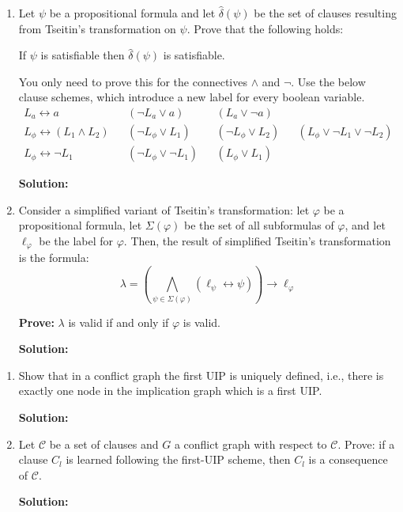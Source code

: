 \documentclass[11pt,a4paper]{uebung}
\newcommand{\solution}[1]{\par {\bf Solution:}\\#1}
\begin{document}
\begin{enumerate}

\item Let $\psi$ be a propositional formula and let $\hat{\delta}(\psi)$ be the set
  of clauses resulting from Tseitin's transformation on $\psi$. Prove that the
  following holds:
  
  \centerline{If $\psi$ is satisfiable then $\hat{\delta}(\psi)$ is satisfiable.}

  You only need to prove this for the connectives $\land$ and $\neg$.
  Use the below clause schemes, which introduce a new label for every boolean
  variable.
  \begin{align*}
    L_a \leftrightarrow a && (\neg L_a \lor a)&& (L_a \lor \neg a)\\
    L_\phi \leftrightarrow (L_1 \land L_2) && (\neg L_\phi \lor L_1)&& (\neg
    L_\phi \lor L_2)&& (L_\phi \lor \neg L_1 \lor \neg L_2)\\
    L_\phi \leftrightarrow \neg L_1 && (\neg L_\phi \lor \neg L_1)&& (L_\phi
    \lor L_1)
  \end{align*}
  
\solution{

}

  \item
Consider a simplified variant of Tseitin's transformation: let $\varphi$ be a
propositional formula, let $\Sigma(\varphi)$ be the set of all subformulas of
$\varphi$, and let $\ell_{\varphi}$ be the label for $\varphi$. Then, the
result of simplified Tseitin's transformation is the formula:
\begin{displaymath}
  \lambda = \left( \bigwedge_{\psi\in \Sigma(\varphi)} \left( \ell_{\psi}
      \leftrightarrow \psi \right) \right) \rightarrow \ell_{\varphi}
\end{displaymath}

{\bf Prove:} $\lambda$ is valid if and only if $\varphi$ is valid.

\solution{

}

\end{enumerate}

\begin{enumerate}
\item Show that in a conflict graph the first UIP is uniquely defined, i.e.,
  there is exactly one node in the implication graph which is a first UIP.

\solution{

}

\item Let $\mathcal{C}$ be a set of clauses and $G$ a conflict graph with
  respect to $\mathcal{C}$. Prove: if a clause $C_l$ is learned following the
  first-UIP scheme, then $C_l$ is a consequence of $\mathcal{C}$.

\solution{

}
\end{enumerate}
\end{document}
